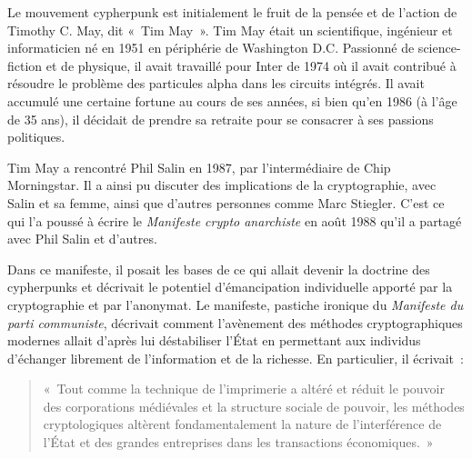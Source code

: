 Le mouvement cypherpunk est initialement le fruit de la pensée et de l'action de Timothy C. May, dit «~Tim May~». Tim May était un scientifique, ingénieur et informaticien né en 1951 en périphérie de Washington D.C. Passionné de science-fiction et de physique, il avait travaillé pour Inter de 1974 où il avait contribué à résoudre le problème des particules alpha dans les circuits intégrés. Il avait accumulé une certaine fortune au cours de ses années, si bien qu'en 1986 (à l'âge de 35 ans), il décidait de prendre sa retraite pour se consacrer à ses passions politiques.

Tim May a rencontré Phil Salin en 1987, par l'intermédiaire de Chip Morningstar. Il a ainsi pu discuter des implications de la cryptographie, avec Salin et sa femme, ainsi que d'autres personnes comme Marc Stiegler. C'est ce qui l'a poussé à écrire le \emph{Manifeste crypto anarchiste} en août 1988 qu'il a partagé avec Phil Salin et d'autres.

Dans ce manifeste, il posait les bases de ce qui allait devenir la doctrine des cypherpunks et décrivait le potentiel d'émancipation individuelle apporté par la cryptographie et par l'anonymat. Le manifeste, pastiche ironique du \emph{Manifeste du parti communiste}, décrivait comment l'avènement des méthodes cryptographiques modernes allait d'après lui déstabiliser l'État en permettant aux individus d'échanger librement de l'information et de la richesse. En particulier, il écrivait~:

\begin{quote}
«~Tout comme la technique de l'imprimerie a altéré et réduit le pouvoir des corporations médiévales et la structure sociale de pouvoir, les méthodes cryptologiques altèrent fondamentalement la nature de l'interférence de l'État et des grandes entreprises dans les transactions économiques.~»
\end{quote} %

